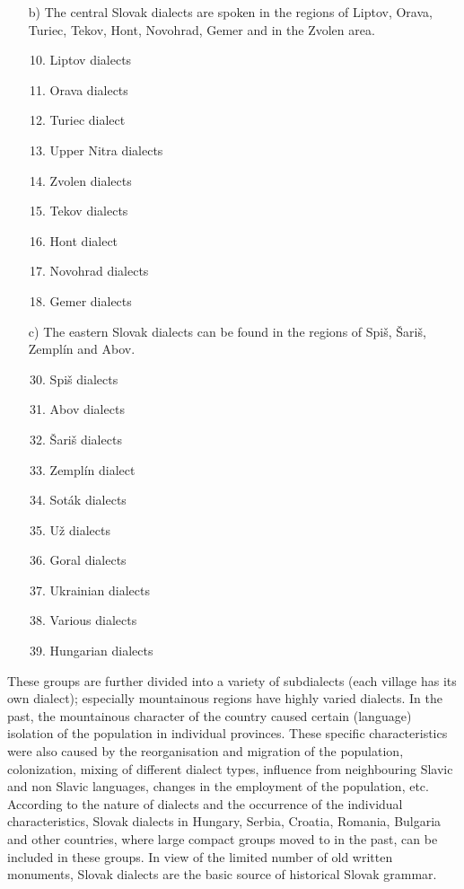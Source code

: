 \begin{multicols}{2}
\begin{itemize}
\item[b)] The central Slovak dialects are spoken in the regions of Liptov, Orava, Turiec, Tekov, Hont, Novohrad, Gemer and in the Zvolen area.

\begin{enumerate}
\setcounter{enumi}{9}
\item Liptov dialects
\item Orava dialects
\item Turiec dialect
\item Upper Nitra dialects
\item Zvolen dialects
\item Tekov dialects
\item Hont dialect
\item Novohrad dialects
\item Gemer dialects
\end{enumerate}

\item[c)] The eastern Slovak dialects can be found in the regions of Spiš, Šariš, Zemplín and Abov.

\begin{enumerate}
\setcounter{enumi}{29}
\item Spiš dialects
\item Abov dialects
\item Šariš dialects
\item Zemplín dialect
\item Soták dialects
\item Už dialects
\setcounter{enumi}{39}
\item Goral dialects
\item Ukrainian dialects
\item Various dialects
\item Hungarian dialects
\end{enumerate}
\end{itemize}

\medskip

These groups are further divided into a variety of subdialects (each village has its own dialect); especially mountainous regions have highly varied dialects. In the past, the mountainous character of the country caused certain (language) isolation of the population in individual provinces. These specific characteristics were also caused by the reorganisation and migration of the population, colonization, mixing of different dialect types, influence from neighbouring Slavic and non Slavic languages, changes in the employment of the population, etc. According to the nature of dialects and the occurrence of the individual characteristics, Slovak dialects in Hungary, Serbia, Croatia, Romania, Bulgaria and other countries, where large compact groups moved to in the past, can be included in these groups. In view of the limited number of old written monuments, Slovak dialects are the basic source of historical Slovak grammar.


\end{multicols}
